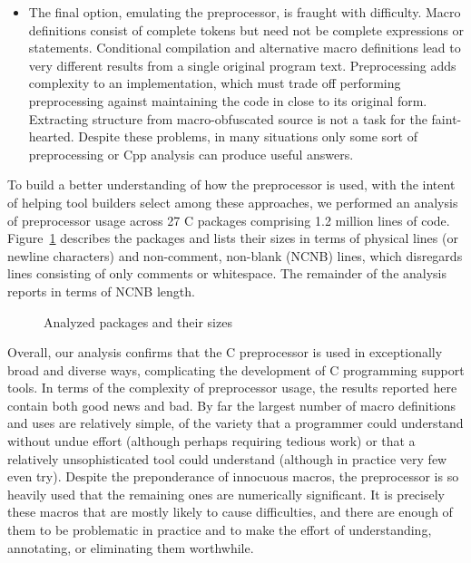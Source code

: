 \documentclass[11pt]{article}
\def\numpackages{27}
\def\numlines{1.2 million}
\begin{document}
\begin{itemize}
\item The final option, emulating the preprocessor, is fraught with
difficulty.  Macro definitions consist of complete tokens but need not
be complete expressions or statements.  Conditional compilation and
alternative macro definitions lead to very different results from a
single original program text.  Preprocessing adds complexity to an
implementation, which must trade off performing preprocessing against
maintaining the code in close to its original form.  Extracting
structure from macro-obfuscated source is not a task for the
faint-hearted.  Despite these problems, in many situations only some
sort of preprocessing or Cpp analysis can produce useful answers.

\end{itemize}

To build a better understanding of how the preprocessor is used, with
the intent of helping tool builders select among these approaches, we
performed an analysis of preprocessor usage across {\numpackages} C
packages comprising {\numlines} lines of code.
Figure~\ref{fig:packages} describes the packages and lists their sizes
in terms of physical lines (or newline characters) and non-comment,
non-blank (NCNB) lines, which disregards lines consisting of only
comments or whitespace.  The remainder of the analysis reports in
terms of NCNB length.

\begin{figure}
\centering
{%
  \setlength{\tabcolsep}{.25em}
  
}
\caption{Analyzed packages and their sizes}
\label{fig:packages}
\end{figure}

Overall, our analysis confirms that the C preprocessor is used in
exceptionally broad and diverse ways, complicating the development of
C programming support tools.  In terms of the complexity of
preprocessor usage, the results reported here contain both good news
and bad.  By far the largest number of macro definitions and uses are
relatively simple, of the variety that a programmer could understand
without undue effort (although perhaps requiring tedious work) or that
a relatively unsophisticated tool could understand (although in
practice very few even try).  Despite the preponderance of innocuous
macros, the preprocessor is so heavily used that the remaining ones
are numerically significant.  It is precisely these macros that are
mostly likely to cause difficulties, and there are enough of them to
be problematic in practice and to make the effort of understanding,
annotating, or eliminating them worthwhile.
\end{document}
